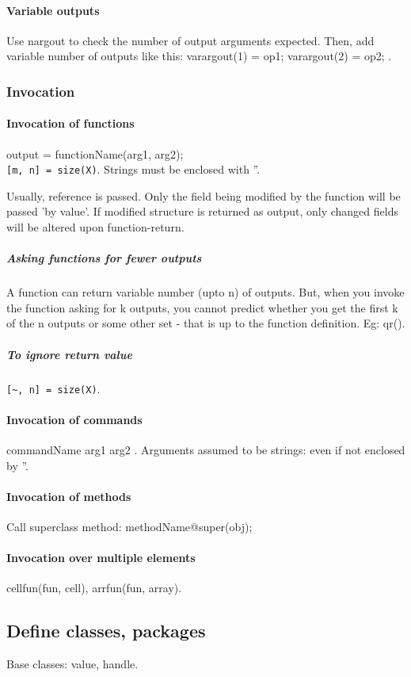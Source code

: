 \paragraph*{Variable outputs}
Use nargout to check the number of output arguments expected. Then, add variable number of outputs like this: varargout(1) = {op1}; varargout(2) = {op2}; .

\subsubsection{Invocation}
\paragraph*{Invocation of functions}
output = functionName(arg1, arg2);\\
\verb'[m, n] = size(X)'. Strings must be enclosed with ''.

Usually, reference is passed. Only the field being modified by the function will be passed 'by value'. If modified structure is returned as output, only changed fields will be altered upon function-return.

\subparagraph*{Asking functions for fewer outputs}
A function can return variable number (upto n) of outputs. But, when you invoke the function asking for k outputs, you cannot predict whether you get the first k of the n outputs or some other set - that is up to the function definition. Eg: qr().

\subparagraph*{To ignore return value}
\verb'[~, n] = size(X)'.


\paragraph*{Invocation of commands}
commandName arg1 arg2 . Arguments assumed to be strings: even if not enclosed by ''.

\paragraph*{Invocation of methods}
Call superclass method: methodName@super(obj);

\paragraph*{Invocation over multiple elements}
cellfun(fun, cell), arrfun(fun, array).

\subsection{Define classes, packages}
Base classes: value, handle.

